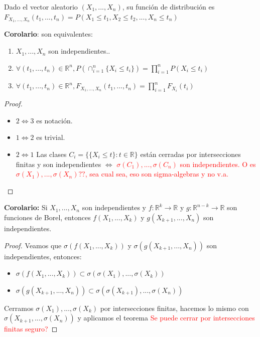 \documentclass{apuntes}
\begin{document}
\begin{defn}
Dado el vector aleatorio $(X_1,...,X_n)$, su función de distribución es $F_{X_1,...,X_n}(t_1,...,t_n)=P(X_1 \leq t_1, X_2 \leq t_2,...,X_n \leq t_n)$
\end{defn}

\textbf{Corolario}: son equivalentes:
\begin{enumerate}
\item $X_1,...,X_n$ son independientes..
\item $\forall(t_1,...,t_n) \in \mathbb{R}^n, P(\cap_{i=1}^n \{X_i \leq t_i\})=\prod_{i=1}^{n}P(X_i \leq t_i)$
\item $\forall(t_1,...,t_n) \in \mathbb{R}^n, F_{X_1,...,X_n}(t_1,...,t_n)=\prod_{i=1}^{n}F_{X_i}(t_i)$
\end{enumerate}

\begin{proof}
\begin{itemize}
\item $2 \Leftrightarrow 3$ es notación.
\item $1 \Leftrightarrow 2$ es trivial.
\item $2 \Leftrightarrow 1$ Las clases $C_i=\{\{X_i \leq t\}:t \in \mathbb{R}\}$ están cerradas por intersecciones finitas y son independientes $\Leftrightarrow$ \textcolor{red}{$\sigma(C_1),...,\sigma(C_n)$ son independientes. O es $\sigma(X_1),...,\sigma(X_n)??$, sea cual sea, eso son sigma-algebras y no v.a.}
\end{itemize}
\end{proof}

\textbf{Corolario:} Si $X_1,...,X_n$ son independientes y $f:\mathbb{R}^k \rightarrow \mathbb{R}$ y $g:\mathbb{R}^{n-k}\rightarrow \mathbb{R}$ son funciones de Borel, entonces $f(X_1,...,X_k)$ y $g(X_{k+1},...,X_n)$ son independientes.

\begin{proof}
Veamos que $\sigma(f(X_1,...,X_k))$ y $\sigma(g(X_{k+1},...,X_n))$ son independientes, entonces:
\begin{itemize}
\item $\sigma(f(X_1,...,X_k)) \subset \sigma(\sigma(X_1),...,\sigma(X_k))$
\item $\sigma(g(X_{k+1},...,X_n)) \subset \sigma(\sigma(X_{k+1}),...,\sigma(X_n))$
\end{itemize}

Cerramos $\sigma(X_1),...,\sigma(X_k)$ por intersecciones finitas, hacemos lo mismo con $\sigma(X_{k+1},...,\sigma(X_n))$ y aplicamos el teorema \textcolor{red}{Se puede cerrar por intersecciones finitas seguro?}
\end{proof}
\end{document}
